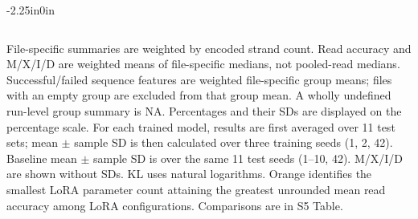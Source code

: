 \begin{table}[!htb]
\begin{adjustwidth}{-2.25in}{0in}
{\begin{tabular}{lccccccccccccc}
\bottomrule
\end{tabular}}
\begin{flushleft}\footnotesize File-specific summaries are weighted by encoded strand count. Read accuracy and M/X/I/D are weighted means of file-specific medians, not pooled-read medians. Successful/failed sequence features are weighted file-specific group means; files with an empty group are excluded from that group mean. A wholly undefined run-level group summary is NA. Percentages and their SDs are displayed on the percentage scale. For each trained model, results are first averaged over 11 test sets; mean $\pm$ sample SD is then calculated over three training seeds (1, 2, 42). Baseline mean $\pm$ sample SD is over the same 11 test seeds (1--10, 42). M/X/I/D are shown without SDs. KL uses natural logarithms. Orange identifies the smallest LoRA parameter count attaining the greatest unrounded mean read accuracy among LoRA configurations. Comparisons are in S5 Table.\end{flushleft}
\end{adjustwidth}
\end{table}
